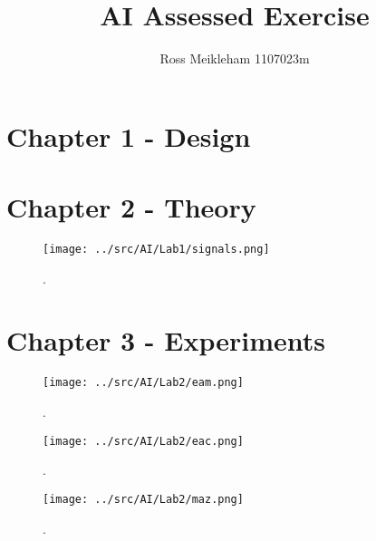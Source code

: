 \documentclass[a4paper]{article}
\begin{document}
\title{AI Assessed Exercise}

\author{Ross Meikleham 1107023m}

\maketitle


\section{Chapter 1 - Design}

\section{Chapter 2 - Theory}



\begin{figure}[H]
\begin{center}
\texttt{[image: ../src/AI/Lab1/signals.png]}
\caption{.}
\label{signals}
\end{center}
\end{figure}



\section{Chapter 3 - Experiments}


\begin{figure}[H]
\begin{center}
\texttt{[image: ../src/AI/Lab2/eam.png]}
\caption{.}
\label{plot1}
\end{center}
\end{figure}


\begin{figure}[H]
\begin{center}
\texttt{[image: ../src/AI/Lab2/eac.png]}
\caption{.}
\label{plot2}
\end{center}
\end{figure}


\begin{figure}[H]
\begin{center}
\texttt{[image: ../src/AI/Lab2/maz.png]}
\caption{.}
\label{plot3}
\end{center}
\end{figure}
\end{document}

